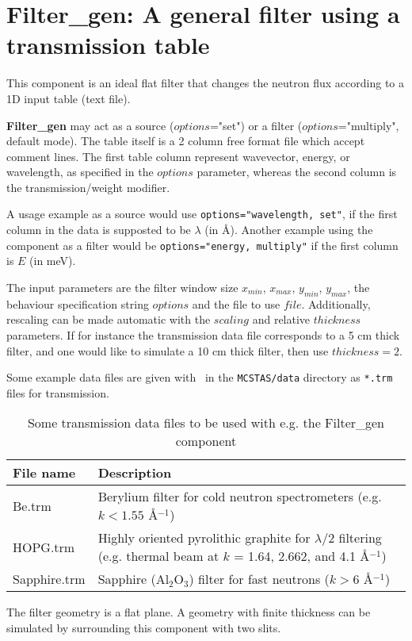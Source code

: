 \section{Filter\_gen: A general filter using a transmission table}
\label{filter-gen}


This component is an ideal flat filter
that changes the neutron flux according to a 1D input table (text file).

{\bf Filter\_gen} may act as a source ($options$="set")
or a filter ($options$="multiply", default mode).
The table itself is a 2 column free format file which accept comment lines.
The first table column represent wavevector, energy, or wavelength,
as specified in the $options$ parameter,
whereas the second column is the transmission/weight modifier.

A usage example as a source would use
\verb+options="wavelength, set"+, if the first column in the data
is supposted to be $\lambda$ (in \AA ).
Another example using the component as a filter would be
\verb+options="energy, multiply"+ if the first column is $E$ (in meV).

The input parameters are the filter window size
$x_{min}$, $x_{max}$, $y_{min}$, $y_{max}$,
the behaviour specification string $options$ and the file to use $file$.
Additionally, rescaling can be made automatic with the $scaling$
and relative $thickness$ parameters. If for instance the transmission data file
corresponds to a 5 cm thick filter, and one would like to simulate a 10 cm thick filter,
then use $thickness = 2$.

Some example data files are given with \MCS\ in the
\verb+MCSTAS/data+ directory as \verb+*.trm+ files for transmission.

\begin{table}
  \begin{center}
  {\let\my=\\
    \begin{tabular}{|l|p{}|}
    \hline
    File name & Description \\
    \hline
    Be.trm       & Berylium filter for cold neutron spectrometers (e.g. $k < 1.55$  \AA$^{-1}$) \\
    HOPG.trm     & Highly oriented pyrolithic graphite for $\lambda/2$ filtering (e.g. thermal beam at $k$ = 1.64, 2.662, and 4.1 \AA$^{-1}$) \\
    Sapphire.trm & Sapphire (Al$_2$O$_3$) filter for fast neutrons ($k > 6$ \AA$^{-1}$) \\
    \hline
    \end{tabular}
    \caption{Some transmission data files to be used with e.g. the Filter\_gen component}
    \label{t:source-params}
  }
  \end{center}
\end{table}

The filter geometry is a flat plane. A geometry with finite thickness can be simulated by
surrounding this component with two slits.